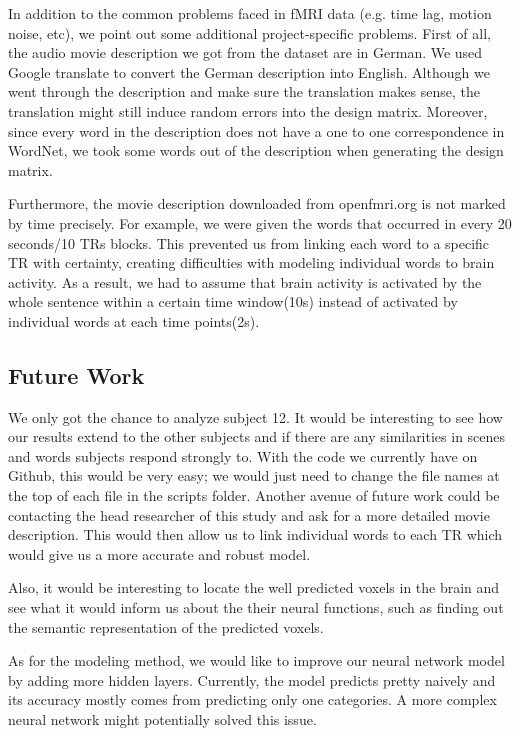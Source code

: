 \par

In addition to the common problems faced in fMRI data (e.g. time lag, motion noise, etc), we point out some additional project-specific problems. First of all, the audio movie description we got from the dataset are in German. We used Google translate to convert the German description into English. Although we went through the description and make sure the translation makes sense, the translation might still induce random errors into the design matrix. Moreover, since every word in the description does not have a one to one correspondence in WordNet, we took some words out of the description when generating the design matrix.

Furthermore, the movie description downloaded from openfmri.org is not marked by time precisely. For example, we were given the words that occurred in every 20 seconds/10 TRs blocks. This prevented us from linking each word to a specific TR with certainty, creating difficulties with modeling individual words to brain activity. As a result, we had to assume that brain activity is activated by the whole sentence within a certain time window(10s) instead of activated by individual words at each time points(2s).


\subsection{Future Work}
\par We only got the chance to analyze subject 12. It would be interesting to see how our results extend to the other subjects and if there are any similarities in scenes and words subjects respond strongly to. With the code we currently have on Github, this would be very easy; we would just need to change the file names at the top of each file in the scripts folder. Another avenue of future work could be contacting the head researcher of this study and ask for a more detailed movie description. This would then allow us to link individual words to each TR which would give us a more accurate and robust model. 

Also, it would be interesting to locate the well predicted voxels in the brain and see what it would inform us about the their neural functions, such as finding out the semantic representation of the predicted voxels.

As for the modeling method, we would like to improve our neural network model by adding more hidden layers. Currently, the model predicts pretty naively and its accuracy mostly comes from predicting only one categories. A more complex neural network might potentially solved this issue.




